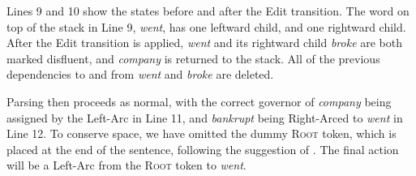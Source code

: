 \documentclass[11pt,letterpaper]{article}
\begin{document}
Lines 9 and 10 show the states before and after the Edit transition. The word
on top of the stack in Line 9, \emph{went}, has one leftward child, and one
rightward child.  After the Edit transition is applied, \emph{went} and its 
rightward child \emph{broke} are both marked disfluent, and \emph{company}
is returned to the stack.  All of the previous dependencies to and from \emph{went}
and \emph{broke} are deleted.

Parsing then proceeds as normal, with the correct governor of \emph{company}
being assigned by the Left-Arc in Line 11, and \emph{bankrupt} being Right-Arced
to \emph{went} in Line 12.  To conserve space, we have omitted the dummy
\textsc{Root} token, which is placed at the end of the sentence, following
the suggestion of \citet{nivre:squib}.  The final action will be a Left-Arc
from the \textsc{Root} token to \emph{went}.
\end{document}
